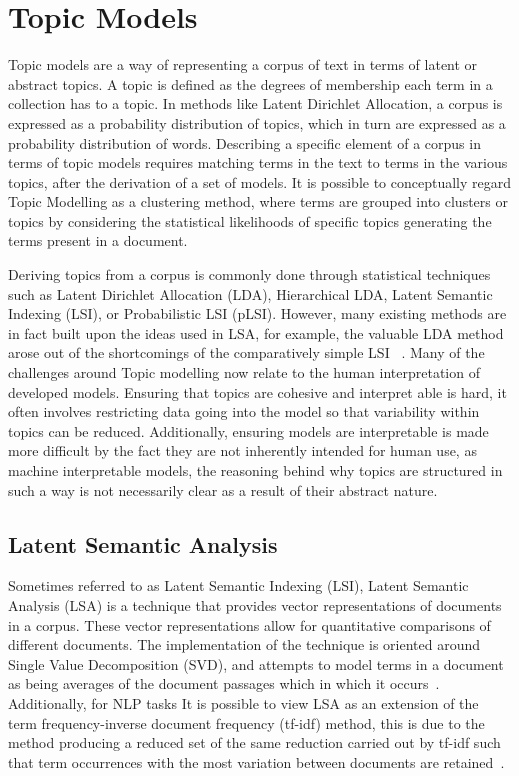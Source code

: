 \documentclass[10pt]{report}
\begin{document}
\section{Topic Models}
Topic models are a way of representing a corpus of text in terms of latent or abstract topics. A topic is defined as the degrees of membership each term in a collection has to a topic. In methods like Latent Dirichlet Allocation, a corpus is expressed as a probability distribution of topics, which in turn are expressed as a probability distribution of words. Describing a specific element of a corpus in terms of topic models requires matching terms in the text to terms in the various topics, after the derivation of a set of models. It is possible to conceptually regard Topic Modelling as a clustering method, where terms are grouped into clusters or topics by considering the statistical likelihoods of specific topics generating the terms present in a document.

Deriving topics from a corpus is commonly done through statistical techniques such as Latent Dirichlet Allocation (LDA), Hierarchical LDA, Latent Semantic Indexing (LSI), or Probabilistic LSI (pLSI). However, many existing methods are in fact built upon the ideas used in LSA, for example, the valuable LDA method arose out of the shortcomings of the comparatively simple LSI ~\cite{Blei2003-dj}. Many of the challenges around Topic modelling now relate to the human interpretation of developed models. Ensuring that topics are cohesive and interpret able is hard, it often involves restricting data going into the model so that variability within topics can be reduced. Additionally, ensuring models are interpretable is made more difficult by the fact they are not inherently intended for human use, as machine interpretable models, the reasoning behind why topics are structured in such a way is not necessarily clear as a result of their abstract nature. 


\subsection{Latent Semantic Analysis}
Sometimes referred to as Latent Semantic Indexing (LSI), Latent Semantic Analysis (LSA) is a technique that provides vector representations of documents in a corpus. These vector representations allow for quantitative comparisons of different documents. The implementation of the technique is oriented around Single Value Decomposition (SVD), and attempts to model terms in a document as being averages of the document passages which in which it occurs~\cite{Deerwester1989-yl}. Additionally, for NLP tasks It is possible to view LSA as an extension of the term frequency-inverse document frequency (tf-idf) method, this is due to the method producing a reduced set of the same reduction carried out by tf-idf such that term occurrences with the most variation between documents are retained~\cite{Landauer1998-kx}.
\end{document}
